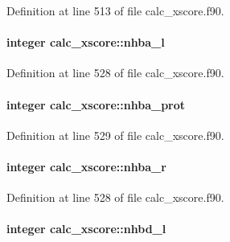 Definition at line 513 of file calc\-\_\-xscore.\-f90.

\hypertarget{classcalc__xscore_a297e94c3e28ef0066c26754706eb1c57}{
\paragraph[{nhba\-\_\-l}]{\setlength{\rightskip}{0pt plus 5cm}integer calc\-\_\-xscore\-::nhba\-\_\-l}}\label{classcalc__xscore_a297e94c3e28ef0066c26754706eb1c57}


Definition at line 528 of file calc\-\_\-xscore.\-f90.

\hypertarget{classcalc__xscore_a19dc78b16e9640a9b3d34ad800cef862}{
\paragraph[{nhba\-\_\-prot}]{\setlength{\rightskip}{0pt plus 5cm}integer calc\-\_\-xscore\-::nhba\-\_\-prot}}\label{classcalc__xscore_a19dc78b16e9640a9b3d34ad800cef862}


Definition at line 529 of file calc\-\_\-xscore.\-f90.

\hypertarget{classcalc__xscore_aac8ba8e6621e14a461ddbdfe3f80b687}{
\paragraph[{nhba\-\_\-r}]{\setlength{\rightskip}{0pt plus 5cm}integer calc\-\_\-xscore\-::nhba\-\_\-r}}\label{classcalc__xscore_aac8ba8e6621e14a461ddbdfe3f80b687}


Definition at line 528 of file calc\-\_\-xscore.\-f90.

\hypertarget{classcalc__xscore_a1e384673c947d9bba8c4788ac1a2f15c}{
\paragraph[{nhbd\-\_\-l}]{\setlength{\rightskip}{0pt plus 5cm}integer calc\-\_\-xscore\-::nhbd\-\_\-l}}\label{classcalc__xscore_a1e384673c947d9bba8c4788ac1a2f15c}


